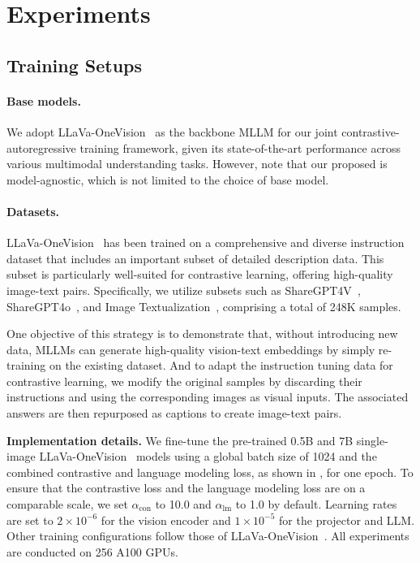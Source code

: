 \section{Experiments}\label{sec:experiments}
\subsection{Training Setups}
\paragraph{Base models.}
We adopt LLaVa-OneVision~\citep{li2024llava} as the backbone MLLM for our joint contrastive-autoregressive training framework, given its state-of-the-art performance across various multimodal understanding tasks. 
%
However, note that our proposed \algname is model-agnostic, which is not limited to the choice of base model.
%

\paragraph{Datasets.}
LLaVa-OneVision~\citep{li2024llava} has been trained on a comprehensive and diverse instruction dataset that includes an important subset of detailed description data. 
%
This subset is particularly well-suited for contrastive learning, offering high-quality image-text pairs.
%
Specifically, we utilize subsets such as ShareGPT4V~\citep{chen2023sharegpt4v}, ShareGPT4o~\citep{sharegpt4o}, and Image Textualization~\citep{pi2024image}, comprising a total of 248K samples. 
%

One objective of this strategy is to demonstrate that, without introducing new data, MLLMs can generate high-quality vision-text embeddings by simply re-training on the existing dataset. 
%
And to adapt the instruction tuning data for contrastive learning, we modify the original samples by discarding their instructions and using the corresponding images as visual inputs.
%
The associated answers are then repurposed as captions to create image-text pairs.
%

\vspace{0.1cm}
\noindent\textbf{Implementation details.}
We fine-tune the pre-trained 0.5B and 7B single-image LLaVa-OneVision~\citep{li2024llava} models using a global batch size of 1024 and the combined contrastive and language modeling loss, as shown in , for one epoch. 
%
To ensure that the contrastive loss and the language modeling loss are on a comparable scale, we set $\alpha_{\text{con}}$ to 10.0 and $\alpha_{\text{lm}}$ to 1.0 by default. 
%
Learning rates are set to $2\times10^{-6}$ for the vision encoder and $1\times10^{-5}$ for the projector and LLM. 
%
Other training configurations follow those of LLaVa-OneVision~\citep{li2024llava}. 
%
All experiments are conducted on 256 A100 GPUs.
%

